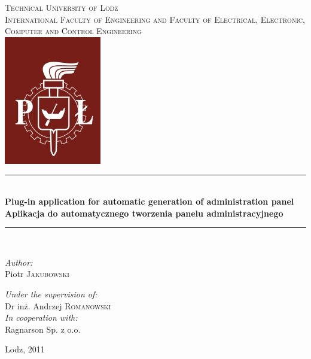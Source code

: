 \begin{titlepage}

\begin{center}
  
\newcommand{\HRule}{\rule{\linewidth}{0.5mm}}

\textsc{\LARGE Technical University of Lodz}\\[0.5cm]

\textsc{\Large International Faculty of Engineering and Faculty of Electrical, Electronic, Computer and Control Engineering}\\[2cm]

\includegraphics{images/title/logo.jpeg}\\[2cm]    



\HRule \\[0.4cm]
{\huge \bfseries Plug-in application for automatic generation of administration panel}\\[0.5cm]
{\Large \bfseries Aplikacja do automatycznego tworzenia panelu administracyjnego}\\[0.5cm]
\HRule \\[0.4cm]



\begin{minipage}[t]{0.4\textwidth}
\begin{flushleft}
\emph{Author:}\\
Piotr \textsc{Jakubowski}
\end{flushleft}
\end{minipage}
\begin{minipage}[t]{0.4\textwidth}
\begin{flushright}
\emph{Under the supervision of:} \\
Dr inż. Andrzej \textsc{Romanowski} \\[0.5cm]
\emph{In cooperation with:}\\
Ragnarson Sp. z o.o.
\end{flushright}
\end{minipage}

\vfill

{\large Lodz, 2011}

\end{center}

\end{titlepage}